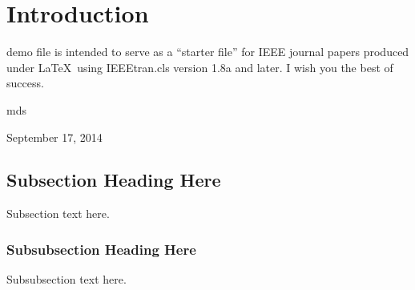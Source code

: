 \documentclass[journal]{IEEEtran}
\begin{document}
\section{Introduction}
% 
% 
% 
% 
 demo file is intended to serve as a ``starter file''
for IEEE journal papers produced under \LaTeX\ using
IEEEtran.cls version 1.8a and later.
I wish you the best of success.

\hfill mds
 
\hfill September 17, 2014

\subsection{Subsection Heading Here}
Subsection text here.


\subsubsection{Subsubsection Heading Here}
Subsubsection text here.


%
%
\end{document}
